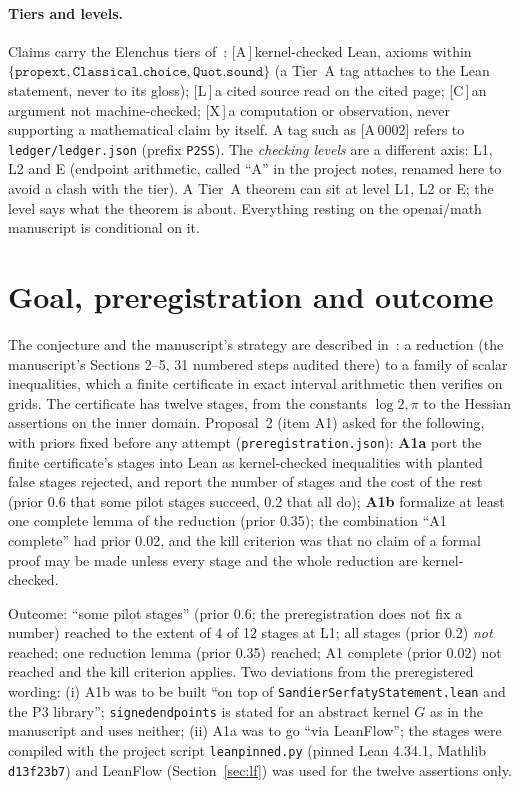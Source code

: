 \documentclass[10pt]{article}
\newcommand{\tg}[2]{\texorpdfstring{\textsf{[#1\,#2]}}{}}  %
\newcommand{\lean}[1]{\texttt{#1}}
\renewcommand{\_}{\textunderscore\allowbreak}
\begin{document}
\paragraph{Tiers and levels.} Claims carry the Elenchus tiers of~\cite{p1}: \tg{A}{}\,kernel-checked Lean, axioms within
$\{\lean{propext},\lean{Classical.choice},\lean{Quot.sound}\}$ (a Tier~A tag attaches to the Lean statement, never to its gloss);
\tg{L}{}\,a cited source read on the cited page; \tg{C}{}\,an argument not machine-checked; \tg{X}{}\,a computation or observation, never supporting a
mathematical claim by itself. A tag such as \tg{A}{0002} refers to \texttt{ledger/ledger.json} (prefix \texttt{P2SS}). The \emph{checking levels}
are a different axis: L1, L2 and E (endpoint arithmetic, called ``A'' in the project notes, renamed here to avoid a clash with the tier). A Tier~A
theorem can sit at level L1, L2 or E; the level says what the theorem is about. Everything resting on the openai/math manuscript is conditional on it.

\section{Goal, preregistration and outcome}\label{sec:goal}
The conjecture and the manuscript's strategy are described in~\cite{p1}: a reduction (the manuscript's Sections 2--5, 31 numbered steps audited
there) to a family of scalar inequalities, which a finite certificate in exact interval arithmetic then verifies on grids. The certificate has twelve stages, from the
constants $\log 2,\pi$ to the Hessian assertions on the inner domain. Proposal~2 (item A1) asked for the following, with priors fixed before
any attempt (\texttt{preregistration.json}): \textbf{A1a} port the finite certificate's stages into Lean as kernel-checked inequalities with planted
false stages rejected, and report the number of stages and the cost of the rest (prior 0.6 that some pilot stages succeed, 0.2 that all do);
\textbf{A1b} formalize at least one complete lemma of the reduction (prior 0.35); the combination ``A1 complete'' had prior 0.02, and the
kill criterion was that no claim of a formal proof may be made unless every stage and the whole reduction are kernel-checked.

Outcome: ``some pilot stages'' (prior 0.6; the preregistration does not fix a number) reached to the extent of 4 of 12 stages at L1; all stages (prior 0.2) \emph{not} reached; one reduction lemma (prior 0.35) reached; A1 complete (prior 0.02) not reached and
the kill criterion applies. Two deviations from the preregistered wording: (i) A1b was to be built ``on top of \lean{SandierSerfatyStatement.lean} and the
P3 library''; \lean{signed\_endpoints} is stated for an abstract kernel $G$ as in the manuscript and uses neither; (ii) A1a was to go ``via
LeanFlow''; the stages were compiled with the project script \texttt{lean\_pinned.py} (pinned Lean 4.34.1, Mathlib \texttt{d13f23b7}) and LeanFlow
(Section~\ref{sec:lf}) was used for the twelve assertions only.
\end{document}
